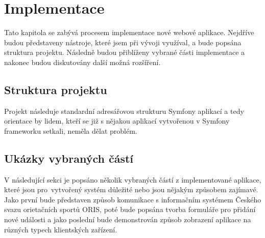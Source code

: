 \chapter{Implementace}
Tato kapitola se zabývá procesem implementace nové webové aplikace. Nejdříve budou představeny nástroje, které jsem při vývoji využíval, a bude popsána struktura projektu. Následně budou přiblíženy vybrané části implementace a nakonec budou diskutovány další možná rozšíření.



\section{Struktura projektu}
Projekt následuje standardní adresářovou strukturu Symfony aplikací a tedy orientace by lidem, kteří se již s nějakou aplikací vytvořenou v Symfony frameworku setkali, neměla dělat problém.


\section{Ukázky vybraných částí}
V následující sekci je popsáno několik vybraných částí z implementované aplikace, které jsou pro~vytvořený systém důležité nebo jsou nějakým způsobem zajímavé. Jako první bude představen způsob komunikace s informačním systémem Českého svazu orietačních sportů ORIS, poté bude popsána tvorba formuláře pro přidání nové události a jako poslední bude demonstrován způsob zobrazení aplikace na různých typech klientských zařízení.





